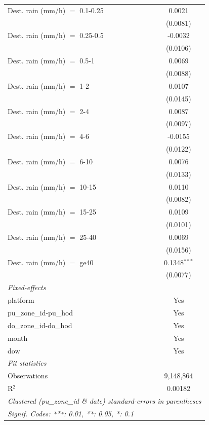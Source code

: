 \begin{tabular}{lc}
   Dest. rain (mm/h) $=$ 0.1-0.25  & 0.0021\\   
                                   & (0.0081)\\   
   Dest. rain (mm/h) $=$ 0.25-0.5  & -0.0032\\   
                                   & (0.0106)\\   
   Dest. rain (mm/h) $=$ 0.5-1     & 0.0069\\   
                                   & (0.0088)\\   
   Dest. rain (mm/h) $=$ 1-2       & 0.0107\\   
                                   & (0.0145)\\   
   Dest. rain (mm/h) $=$ 2-4       & 0.0087\\   
                                   & (0.0097)\\   
   Dest. rain (mm/h) $=$ 4-6       & -0.0155\\   
                                   & (0.0122)\\   
   Dest. rain (mm/h) $=$ 6-10      & 0.0076\\   
                                   & (0.0133)\\   
   Dest. rain (mm/h) $=$ 10-15     & 0.0110\\   
                                   & (0.0082)\\   
   Dest. rain (mm/h) $=$ 15-25     & 0.0109\\   
                                   & (0.0101)\\   
   Dest. rain (mm/h) $=$ 25-40     & 0.0069\\   
                                   & (0.0156)\\   
   Dest. rain (mm/h) $=$ ge40      & 0.1348$^{***}$\\   
                                   & (0.0077)\\   
   \midrule
   \emph{Fixed-effects}\\
   platform                        & Yes\\  
   pu\_zone\_id-pu\_hod            & Yes\\  
   do\_zone\_id-do\_hod            & Yes\\  
   month                           & Yes\\  
   dow                             & Yes\\  
   \midrule
   \emph{Fit statistics}\\
   Observations                    & 9,148,864\\  
   R$^2$                           & 0.00182\\  
   \midrule \midrule
   \multicolumn{2}{l}{\emph{Clustered (pu\_zone\_id \& date) standard-errors in parentheses}}\\
   \multicolumn{2}{l}{\emph{Signif. Codes: ***: 0.01, **: 0.05, *: 0.1}}\\
\end{tabular}
 

